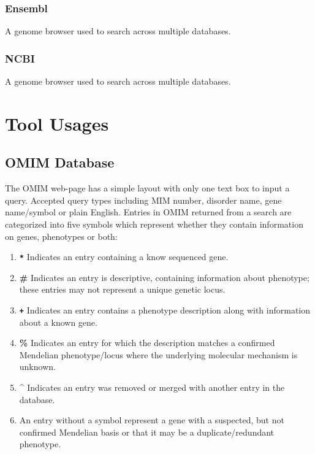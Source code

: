         \subsubsection{Ensembl}

        A genome browser used to search across multiple databases. \autocite{T3}

        \subsubsection{NCBI}

        A genome browser used to search across multiple databases.\autocite{T3}

\section{Tool Usages}

    \subsection{OMIM Database}
    The OMIM web-page has a simple layout with only one text box to input a query. Accepted query types including MIM number, disorder name, gene name/symbol or plain English.\autocite{B5} Entries in OMIM returned from a search are categorized into five symbols which represent whether they contain information on genes, phenotypes or both:\autocite{B5}

        \begin{enumerate}
            
            \item \textbf{\texttt{*}} Indicates an entry containing a know sequenced gene.\autocite{B5}

            \item \textbf{\#} Indicates an entry is descriptive, containing information about phenotype; these entries may not represent a unique genetic locus.\autocite{B5}

            \item \textbf{\texttt{+}} Indicates an entry contains a phenotype description along with information about a known gene.\autocite{B5}

            \item \textbf{\%} Indicates an entry for which the description matches a confirmed Mendelian phenotype/locus where the underlying molecular mechanism is unknown.\autocite{B5}

            \item \textbf{\^} Indicates an entry was removed or merged with another entry in the database.\autocite{B5}

            \item An entry without a symbol represent a gene with a suspected, but not confirmed Mendelian basis or that it may be a duplicate/redundant phenotype.\autocite{B5}
        \end{enumerate}

